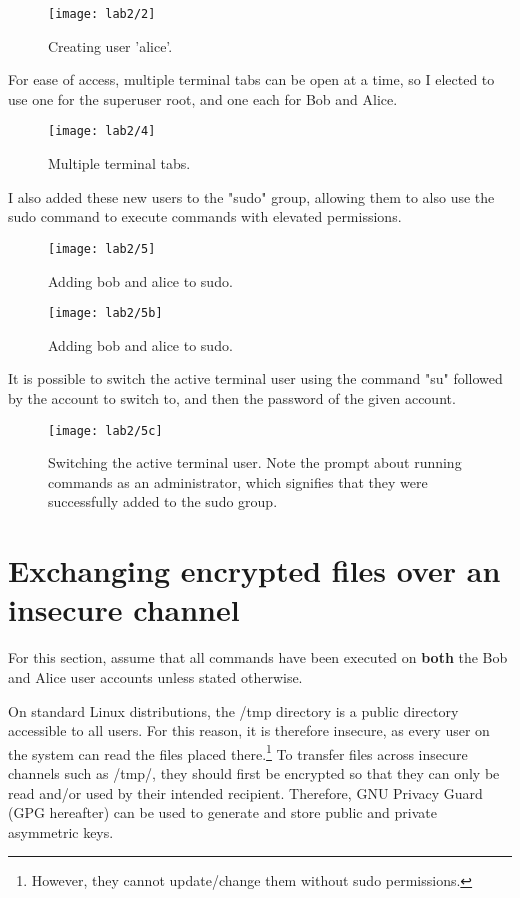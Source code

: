 \begin{figure}[H]
    \centering
    \texttt{[image: lab2/2]}
    \caption{Creating user 'alice'.}
    \label{fig:createAlice}
\end{figure}

For ease of access, multiple terminal tabs can be open at a time, so I elected to use one for the superuser root,
and one each for Bob and Alice.

\begin{figure}[H]
    \centering
    \texttt{[image: lab2/4]}
    \caption{Multiple terminal tabs.}
    \label{fig:terminalTabs}
\end{figure}

I also added these new users to the "sudo" group, allowing them to also use the sudo command to execute commands
with elevated permissions.

\begin{figure}[H]
    \centering
    \texttt{[image: lab2/5]}
    \caption{Adding bob and alice to sudo.}
    \label{fig:sudoAdd1}
\end{figure}

\begin{figure}[H]
    \centering
    \texttt{[image: lab2/5b]}
    \caption{Adding bob and alice to sudo.}
    \label{fig:sudoAdd2}
\end{figure}

It is possible to switch the active terminal user using the command "su" followed by the account to switch to,
and then the password of the given account.

\begin{figure}[H]
    \centering
    \texttt{[image: lab2/5c]}
    \caption{Switching the active terminal user. Note the prompt about running commands as an administrator,
    which signifies that they were successfully added to the sudo group.}
    \label{fig:suBobAlice}
\end{figure}

\pagebreak

\section{Exchanging encrypted files over an insecure channel}\label{sec:tmpExchange}
\begin{tcolorbox}[colback=red!5!white,colframe=red!75!black]
    For this section, assume that all commands have been executed on \textbf{both} the Bob and Alice
    user accounts unless stated otherwise.
\end{tcolorbox}
On standard Linux distributions, the /tmp directory is a public directory accessible to all users.
For this reason, it is therefore insecure, as every user on the system can read the files placed there.\footnote{However, they cannot update/change them without sudo permissions.}
To transfer files across insecure channels such as /tmp/, they should first be encrypted so that
they can only be read and/or used by their intended recipient.
Therefore, GNU Privacy Guard (GPG hereafter) can be used to generate and store public
and private asymmetric keys.

